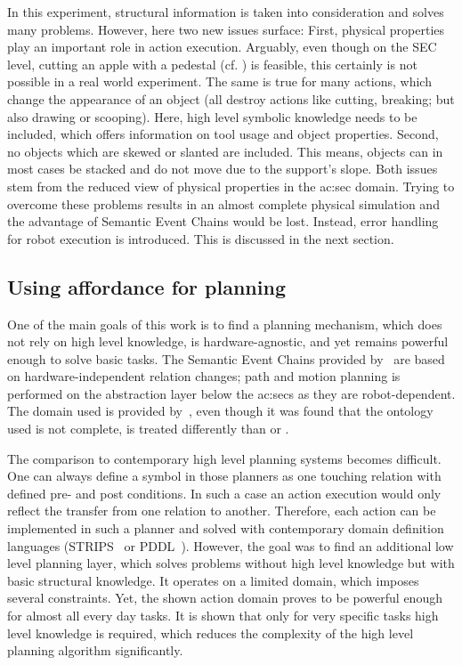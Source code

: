 In this experiment, structural information is taken into consideration and solves many problems.
However, here two new issues surface: First, physical properties play an important role in action execution.
Arguably, even though on the SEC level, cutting an apple with a pedestal (cf. ) is feasible, this certainly is not possible in a real world experiment.
The same is true for many actions, which change the appearance of an object (\ie all destroy actions like cutting, breaking; but also drawing or scooping).
Here, high level symbolic knowledge needs to be included, which offers information on tool usage and object properties.
Second, no objects which are skewed or slanted are included.
This means, objects can in most cases be stacked and do not move due to the support's slope.
Both issues stem from the reduced view of physical properties in the \gls{ac:sec} domain.
Trying to overcome these problems results in an almost complete physical simulation and the advantage of Semantic Event Chains would be lost.
Instead, error handling for robot execution is introduced.
This is discussed in the next section.





\subsection{Using affordance for planning}

One of the main goals of this work is to find a planning mechanism, which does not rely on high level knowledge, is hardware-agnostic, and yet remains powerful enough to solve basic tasks.
The Semantic Event Chains provided by~\textcite{aksoyabramovdoerr2011} are based on hardware-independent relation changes; path and motion planning is performed on the abstraction layer below the \glspl{ac:sec} as they are robot-dependent.
The domain used is provided by~\textcite{worgotter2013simple}, even though it was found that the ontology used is not complete, \eg {} is treated differently than  or .

The comparison to contemporary high level planning systems becomes difficult.
One can always define a symbol in those planners as one touching relation with defined pre- and post conditions.
In such a case an action execution would only reflect the transfer from one relation to another.
Therefore, each action can be implemented in such a planner and solved with contemporary domain definition languages (\eg STRIPS~\cite{fikes1971} or PDDL~\cite{mcdermott1998}).
However, the goal was to find an additional low level planning layer, which solves problems without high level knowledge but with basic structural knowledge.
It operates on a limited domain, which imposes several constraints. 
Yet, the shown action domain proves to be powerful enough for almost all every day tasks.
It is shown that only for very specific tasks high level knowledge is required, which reduces the complexity of the high level planning algorithm significantly.


